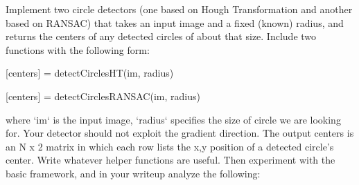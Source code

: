 \documentclass[11pt]{article}
\begin{document}
    Implement two circle detectors (one based on Hough Transformation and another based on RANSAC) that takes an input
    image and a fixed (known) radius, and returns the centers of any detected circles of about that size.
    Include two functions with the following form:
    \begin{center}
    [centers]
        = detectCirclesHT(im, radius)
    \end{center}
    \begin{center}
    [centers]
        = detectCirclesRANSAC(im, radius)
    \end{center}
    where ‘im‘ is the input image, ‘radius‘ specifies the size of circle we are looking for.
    Your detector should not exploit the gradient direction. The output centers is an N x 2 matrix in which each row
    lists the x,y position of a detected circle’s center. Write whatever helper functions are useful. Then experiment
    with the basic framework, and in your writeup analyze the following:
\end{document}
